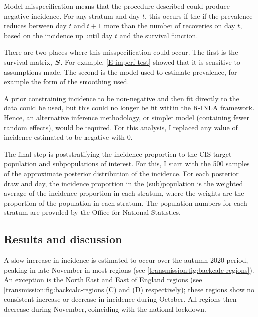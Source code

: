 \documentclass[thesis.tex]{subfiles}
\begin{document}
Model misspecification means that the procedure described could produce negative incidence.
For any stratum and day $t$, this occurs if the if the prevalence reduces between day $t$ and $t+1$ more than the number of recoveries on day $t$, based on the incidence up until day $t$ and the survival function.

There are two places where this misspecification could occur.
The first is the survival matrix, $\bm{S}$.
For example, \cref{E-imperf-test} showed that it is sensitive to assumptions made.
The second is the model used to estimate prevalence, for example the form of the smoothing used.

A prior constraining incidence to be non-negative and then fit directly to the data could be used, but this could no longer be fit within the R-INLA framework.
Hence, an alternative inference methodology, or simpler model (\eg containing fewer random effects), would be required.
For this analysis, I replaced any value of incidence estimated to be negative with 0.

The final step is poststratifying the incidence proportion to the CIS target population and subpopulations of interest.
For this, I start with the 500 samples of the approximate posterior distribution of the incidence.
For each posterior draw and day, the incidence proportion in the (sub)population is the weighted average of the incidence proportion in each stratum, where the weights are the proportion of the population in each stratum.
The population numbers for each stratum are provided by the Office for National Statistics.

\subsection{Results and discussion} \label{backcalc:sec:results}

A slow increase in incidence is estimated to occur over the autumn 2020 period, peaking in late November in most regions (see \cref{transmission:fig:backcalc-regions}).
An exception is the North East and East of England regions (see \cref{transmission:fig:backcalc-regions}(C) and (D) respectively); these regions show no consistent increase or decrease in incidence during October.
All regions then decrease during November, coinciding with the national lockdown.
\end{document}
